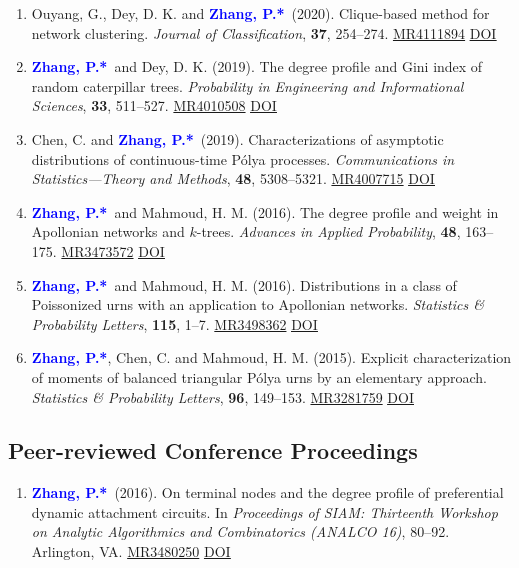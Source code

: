 \documentclass{res}
\def\MR#1{\href{http://www.ams.org/mathscinet-getitem?mr=#1}{MR#1}}
\newcommand{\PZ}{\textbf{\textcolor{blue}{Zhang, P.*}}}
\begin{document}
\begin{resume}
\begin{enumerate}
	\item {\sc Ouyang, G., Dey, D. K.} and \PZ\ (2020). 
	Clique-based method for network clustering. {\em Journal of 
	Classification}, \textbf{37}, 254--274. \MR{4111894}
	\href{https://doi.org/10.1007/s00357-019-9310-5}
	{\underline{DOI}}
	
	\item \PZ\ and {\sc Dey, D. K.} (2019). The degree 
	profile and Gini index of random caterpillar trees. {\em 
	Probability in Engineering and Informational Sciences}, 
	\textbf{33}, 511--527. \MR{4010508}
	\href{https://doi.org/10.1017/S0269964818000475}
	{\underline{DOI}}
		
	\item {\sc Chen, C.} and \PZ\ (2019). Characterizations of 
	asymptotic distributions of continuous-time P\'{o}lya processes. 
	{\em Communications in Statistics---Theory and Methods}, 
	\textbf{48}, 5308--5321. \MR{4007715}
	\href{https://doi.org/10.1080/03610926.2018.1510005}
	{\underline{DOI}}
	
	\item \PZ\ and {\sc Mahmoud, H. M.} (2016). The 
	degree profile and weight in Apollonian networks and $k$-trees. 
	\emph{Advances in Applied Probability}, \textbf{48}, 163--175. 
	\MR{3473572}
	\href{https://doi.org/10.1017/apr.2015.11}
	{\underline{DOI}}
		
	\item \PZ\ and {\sc Mahmoud, H. M.} (2016). 
	Distributions in a class of Poissonized urns with an application 
	to Apollonian networks. \emph{Statistics \& Probability 
	Letters}, {\bf 115}, 1--7. \MR{3498362}
	\href{https://doi.org/10.1016/j.spl.2016.03.023}
	{\underline{DOI}}

	\item \PZ, {\sc Chen, C.} and {\sc Mahmoud, H. M.} 
	(2015). Explicit characterization of moments of balanced 
	triangular P\'{o}lya urns by an elementary approach. 
	\emph{Statistics \& Probability Letters}, {\bf 96}, 149--153. 
	\MR{3281759}
	\href{https://doi.org/10.1016/j.spl.2014.09.016}
	{\underline{DOI}}	
\end{enumerate} 

\subsection{Peer-reviewed Conference Proceedings}
\begin{enumerate}
	\item \PZ\ (2016). On terminal nodes and the degree 
	profile of preferential dynamic attachment circuits. In 
	\emph{Proceedings of SIAM: Thirteenth Workshop on Analytic 
	Algorithmics and Combinatorics (ANALCO 16)}, 80--92. Arlington, 
	VA. \MR{3480250}
	\href{https://doi.org/10.1137/1.9781611974324.9}
	{\underline{DOI}}	
\end{enumerate}


\end{resume}
\end{document}
